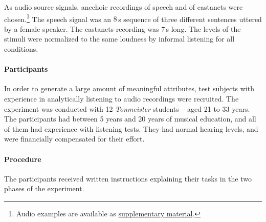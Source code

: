 As audio source signals, anechoic recordings of speech and of castanets were
chosen.\footnote{Audio examples are available as
\href{http://audio.qu.tu-berlin.de/?p=625}{\color{link}supplementary
material}.} The speech signal was an $8$\,s
sequence of three different sentences uttered by a female speaker. The
castanets recording was $7$\,s long. The levels of the stimuli were normalized to
the same loudness by informal listening for all conditions.


\paragraph{Participants}
In order to generate a large amount of meaningful attributes, test subjects with
experience in analytically listening to audio recordings were recruited.  The
experiment was conducted with 12 \emph{Tonmeister} students -- aged 21 to 33
years. The participants had between 5 years and 20 years
of musical education, and all of them had experience with listening
tests. They had normal hearing levels, and were financially compensated for
their effort.


\paragraph{Procedure}
The participants received written instructions explaining their tasks in the two
phases of the experiment.

